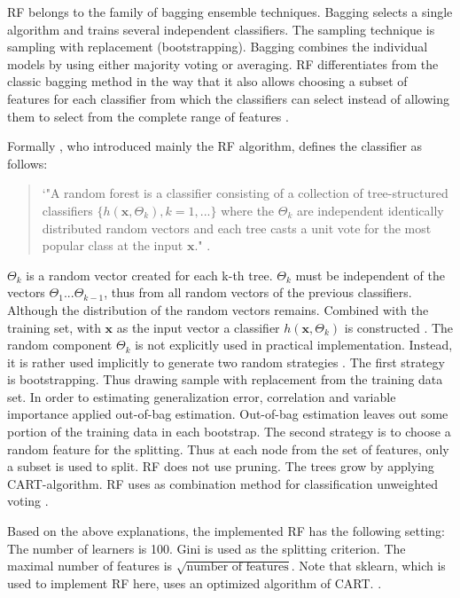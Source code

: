 \documentclass[12pt, a4paper, titlepage]{article}
\begin{document}
\ac{RF} belongs to the family of bagging ensemble techniques.
Bagging selects a single algorithm and trains several independent classifiers. The sampling technique is sampling with replacement (bootstrapping). Bagging combines the individual models by using either majority voting or averaging. \ac{RF} differentiates from the classic bagging method in the way that it also allows choosing a subset of features for each classifier from which the classifiers can select instead of allowing them to select from the complete range of features \citep{polikar2012, zhou2009, Berthold2020}. 

Formally \citet{breiman2001}, who introduced mainly the \ac{RF} algorithm, defines the classifier as follows:

\begin{quote}
`"A random forest is a classifier consisting of a collection of tree-structured classifiers $\{h(\textbf{x}, \Theta_k), k = 1, ...\}$ where the ${\Theta_k}$ are independent identically distributed random vectors and each tree casts a unit vote for the most popular class at the input $\textbf{x}$." \citep[6]{breiman2001}. 
\end{quote}
$\Theta_k$ is a random vector created for each k-th tree. $\Theta_k$ must be independent of the vectors $\Theta_1...\Theta_{k-1}$, thus from all random vectors of the previous classifiers. Although the distribution of the random vectors remains. Combined with the training set, with $\textbf{x}$ as the input vector a classifier $h(\textbf{x}, \Theta_k)$ is constructed \citep{breiman2001}. The random component $\Theta_k$ is not explicitly used in practical implementation. Instead, it is rather used implicitly to generate two random strategies \citep{cutler2012}. The first strategy is bootstrapping. Thus drawing sample with replacement from the training data set. In order to estimating generalization error, correlation and variable importance \citet{breiman2001} applied out-of-bag estimation. Out-of-bag estimation leaves out some portion of the training data in each bootstrap. The second strategy is to choose a random feature for the splitting. Thus at each node from the set of features, only a subset is used to split. \ac{RF} does not use pruning. The trees grow by applying \ac{CART}-algorithm. \ac{RF} uses as combination method for classification unweighted voting \citep{cutler2012}.

Based on the above explanations, the implemented \ac{RF} has the following setting: The number of learners is 100. Gini is used as the splitting criterion. The maximal number of features is $\sqrt{\text{number of features}}$. Note that sklearn, which is used to implement \ac{RF} here, uses an optimized algorithm of \ac{CART}. \citep{scikit-learn}.
\end{document}
